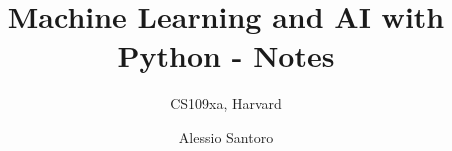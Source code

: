 \documentclass[10pt,a4paper]{report}
\author{Alessio Santoro}
\title{Machine Learning and AI with Python - Notes}
\subtitle{CS109xa, Harvard}
\begin{document}
\maketitle
\tableofcontents
\pagebreak




\end{document}
